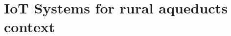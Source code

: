 \documentclass[conference]{IEEEtran}
\begin{document}

\section{IoT Systems for rural aqueducts context}
\end{document}
